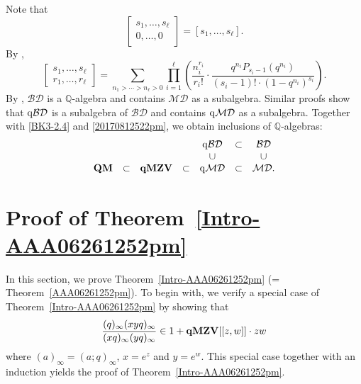 \documentclass[12pt, reqno]{amsart}
\theoremstyle{definition}
\theoremstyle{remark}
\numberwithin{equation}{section}
\newcommand{\BD}{\mathcal {BD}}
\newcommand{\MD}{\mathcal {MD}}
\newcommand{\Q}{ \mathbb Q }
\newcommand{\qBD}{{\rm q}{\mathcal {BD}}}
\newcommand{\qMD}{{\rm q}{\mathcal {MD}}}
\newcommand{\qMZV}{ {\bf qMZV} }
\def\beq{\begin{equation}}
\def\eeq{\end{equation}}
\numberwithin{equation}{section}
\begin{document}
Note that 
$$
  \begin{bmatrix} s_1, \ldots, s_\ell\\0, \ldots, 0 \end{bmatrix}
= [s_1, \ldots, s_\ell].
$$
By \cite[(2.7)]{BK2}, 
\beq  \label{BK2-2.7}
  \begin{bmatrix} s_1, \ldots, s_\ell\\r_1, \ldots, r_\ell \end{bmatrix}
= \sum_{n_1 > \cdots > n_\ell > 0} \prod_{i=1}^\ell 
  \left (\frac{n_i^{r_i}}{r_i!} \cdot 
  \frac{q^{n_i}P_{s_i-1}(q^{n_i})}{(s_i-1)! \cdot (1-q^{n_i})^{s_i}} 
  \right ).
\eeq
By \cite[Theorem~A~i)]{Bac}, $\BD$ is a $\Q$-algebra and contains 
$\MD$ as a subalgebra. Similar proofs show that 
$\qBD$ is a subalgebra of $\BD$ and contains $\qMD$ as a subalgebra. 
Together with \eqref{BK3-2.4} and \eqref{20170812522pm}, 
we obtain inclusions of $\Q$-algebras:
\begin{eqnarray}   \label{Comm_alg}  
\begin{matrix}
&&&&\qBD &\subset&\BD   \\
&&&&\cup &&\cup   \\
{\bf QM}&\subset &\qMZV&\subset &\qMD&\subset&\MD.  
\end{matrix}
\end{eqnarray} 

\section{\bf Proof of Theorem~\ref{Intro-AAA06261252pm}} 
\label{sect_Expressing}

In this section, we prove Theorem~\ref{Intro-AAA06261252pm} 
(= Theorem~\ref{AAA06261252pm}). To begin with, we verify  
a special case of Theorem~\ref{Intro-AAA06261252pm} by showing that  
$$
\frac{(q)_\infty (xyq)_\infty}{(xq)_\infty (yq)_\infty} \in 1 
+ \qMZV[[z, w]] \cdot zw
$$
where $(a)_\infty = (a; q)_\infty$, $x = e^{z}$ and $y = e^{w}$. 
This special case together with an induction yields the proof of 
Theorem~\ref{Intro-AAA06261252pm}.
\end{document}
